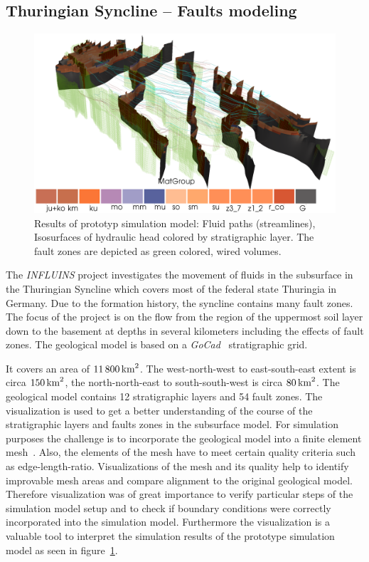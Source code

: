 \documentclass[twocolumn]{svjour3}          %
\begin{document}

\subsection{Thuringian Syncline -- Faults modeling}
\label{thuringian-syncline---faults}

\begin{figure}[htb]
  \includegraphics[width=\linewidth]{images/ThuringianSyncline.png}
\caption{Results of prototyp simulation model: Fluid paths (streamlines),
Isosurfaces of hydraulic head colored by stratigraphic layer. The fault zones
are depicted as green colored, wired volumes.}
\label{fig:ThuringianSyncline}
\end{figure}

The \emph{INFLUINS} project investigates the movement of fluids in the
subsurface in the Thuringian Syncline which covers most of the federal state
Thuringia in Germany. Due to the formation history, the syncline contains many
fault zones. The focus of the project is on the flow from the region of the
uppermost soil layer down to the basement at depths in several kilometers
including the effects of fault zones. The geological model is based on a \emph{
GoCad}~\cite{web:gocad} stratigraphic grid.

It covers an area of $11\,800\,\textnormal{km}^2$. The west-north-west to
east-south-east extent is circa $150\,\textnormal{km}^2$, the north-north-east to
south-south-west is circa $80\,\textnormal{km}^2$. The geological model contains 12
stratigraphic layers and 54 fault zones. The visualization is used to get a
better understanding of the course of the stratigraphic layers and faults zones
in the subsurface model. For simulation purposes the challenge is to incorporate the geological model into a finite element mesh~\cite{zehner:gocad}. Also, the elements of the mesh have to meet certain quality criteria such as edge-length-ratio. Visualizations of the mesh and its quality help to identify improvable mesh areas and compare alignment to the original geological model.
Therefore visualization was of great importance to verify particular
steps of the simulation model setup and to
check if boundary conditions were correctly incorporated into the simulation
model. Furthermore the visualization is a valuable tool to interpret the
simulation results of the prototype simulation model as seen in
figure~\ref{fig:ThuringianSyncline}.
\end{document}
